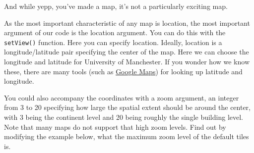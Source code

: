 \documentclass[]{book}
\newenvironment{Shaded}{\begin{snugshade}}{\end{snugshade}}
\newcommand{\CommentTok}[1]{\textcolor[rgb]{0.56,0.35,0.01}{\textit{#1}}}
\newcommand{\DataTypeTok}[1]{\textcolor[rgb]{0.13,0.29,0.53}{#1}}
\newcommand{\DecValTok}[1]{\textcolor[rgb]{0.00,0.00,0.81}{#1}}
\newcommand{\FloatTok}[1]{\textcolor[rgb]{0.00,0.00,0.81}{#1}}
\newcommand{\KeywordTok}[1]{\textcolor[rgb]{0.13,0.29,0.53}{\textbf{#1}}}
\newcommand{\NormalTok}[1]{#1}
\newcommand{\OperatorTok}[1]{\textcolor[rgb]{0.81,0.36,0.00}{\textbf{#1}}}
\newcommand{\StringTok}[1]{\textcolor[rgb]{0.31,0.60,0.02}{#1}}
\begin{document}
\begin{Shaded}
\end{Shaded}

\hypertarget{htmlwidget-7243eda3d7d0abfc099a}{}

And while yepp, you've made a map, it's not a particularly exciting map.

As the most important characteristic of any map is location, the most important argument of our code is the location argument. You can do this with the \texttt{setView()} function. Here you can specify location. Ideally, location is a longitude/latitude pair specifying the center of the map. Here we can choose the longitude and latitude for University of Manchester. If you wonder how we know these, there are many tools (such as \href{https://support.google.com/maps/answer/18539?co=GENIE.Platform\%3DDesktop\&hl=en}{Google Maps}) for looking up latitude and longitude.

You could also accompany the coordinates with a zoom argument, an integer from 3 to 20 specifying how large the spatial extent should be around the center, with 3 being the continent level and 20 being roughly the single building level. Note that many maps do not support that high zoom levels. Find out by modifying the example below, what the maximum zoom level of the default tiles is.

\begin{Shaded}
\end{Shaded}

\hypertarget{htmlwidget-4396765f25f41794b5c8}{}
\end{document}
